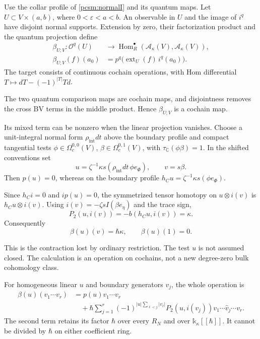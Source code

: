 Use the collar profile of \eqref{pcsm:normalI} and its quantum maps.
Let \(U\subset V\times(a,b)\), where
\(0<\varepsilon<a<b\).
An observable in \(U\) and the image of \(i^q\) have disjoint
normal supports. Extension by zero, their factorization product and
the quantum projection define
\begin{equation}\label{pcsm:beta}
 \begin{split}
 \beta_{U;V}:\mathcal O^q(U)&\longrightarrow
       \operatorname{Hom}^\bullet_R
                    (\mathcal A_\kappa(V),\mathcal A_\kappa(V)),\\
 \beta_{U;V}(f)(a_0)&=
       p^q\bigl(\operatorname{ext}_U(f)\,i^q(a_0)\bigr).
 \end{split}
\end{equation}
The target consists of continuous cochain operations, with
Hom differential \(T\mapsto dT-(-1)^{|T|}Td\).

The two quantum comparison maps are cochain maps, and disjointness
removes the cross BV terms in the middle product.
Hence \(\beta_{U;V}\) is a cochain map.

Its mixed term can be nonzero when the linear projection vanishes.
Choose\label{pcsm:def:mixed-collar-test} a unit-integral normal form \(\rho_{\mathrm{int}}dt\)
above the boundary profile and compact tangential tests
\(\phi\in\Omega_c^{0,0}(V)\),
\(\beta\in\Omega_c^{0,1}(V)\), with
\(\tau_{\mathbb C}(\phi\beta)=1\).
In the shifted conventions set
\[
 u=\zeta^{-1}\kappa s(\rho_{\mathrm{int}}dt\,\phi e_\Phi),
 \qquad v=s\beta.
\]
Then \(p(u)=0\), whereas on the boundary profile
\(h_Cu=\zeta^{-1}\kappa s(\phi e_\Phi)\).

Since \(h_Ci=0\) and \(ip(u)=0\), the symmetrized tensor
homotopy on \(u\otimes i(v)\) is \(h_Cu\otimes i(v)\).
Using \(i(v)=-\zeta sI(\beta e_\eta)\) and the trace sign,
\[
 P_2(u,i(v))=-b(h_Cu,i(v))=\kappa.
\]
Consequently
\[
 \beta(u)(v)=\hbar\kappa,\qquad \beta(u)(1)=0.
\]

This is the contraction lost by ordinary restriction.
The test \(u\) is not assumed closed. The calculation is an
operation on cochains, not a new degree-zero bulk cohomology class.

For homogeneous linear \(u\) and boundary generators \(v_j\),
the whole operation is
\[
 \begin{split}
 \beta(u)(v_1\cdots v_r)
 &=p(u)v_1\cdots v_r\\
 &\quad+\hbar\sum_{j=1}^r
 (-1)^{|u|\sum_{\ell<j}|v_\ell|}P_2(u,i(v_j))
                         v_1\cdots\widehat v_j\cdots v_r.
 \end{split}
\]
The second term retains its factor \(\hbar\) over every \(R_N\)
and over \(\mathbb k_\kappa[[\hbar]]\).
It cannot be divided by \(\hbar\) on either coefficient ring.


